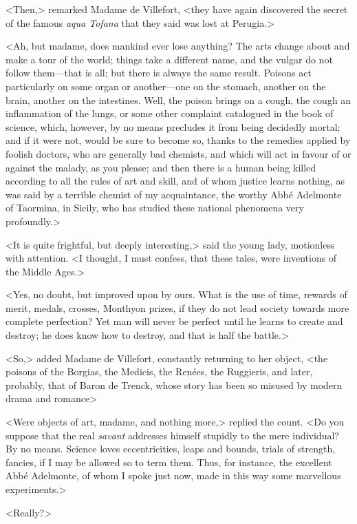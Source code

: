  <Then,> remarked Madame de Villefort, <they have again discovered the secret of the famous \textit{aqua Tofana} that they said was lost at Perugia.> 

 <Ah, but madame, does mankind ever lose anything? The arts change about and make a tour of the world; things take a different name, and the vulgar do not follow them—that is all; but there is always the same result. Poisons act particularly on some organ or another—one on the stomach, another on the brain, another on the intestines. Well, the poison brings on a cough, the cough an inflammation of the lungs, or some other complaint catalogued in the book of science, which, however, by no means precludes it from being decidedly mortal; and if it were not, would be sure to become so, thanks to the remedies applied by foolish doctors, who are generally bad chemists, and which will act in favour of or against the malady, as you please; and then there is a human being killed according to all the rules of art and skill, and of whom justice learns nothing, as was said by a terrible chemist of my acquaintance, the worthy Abbé Adelmonte of Taormina, in Sicily, who has studied these national phenomena very profoundly.> 

 <It is quite frightful, but deeply interesting,> said the young lady, motionless with attention. <I thought, I must confess, that these tales, were inventions of the Middle Ages.> 

 <Yes, no doubt, but improved upon by ours. What is the use of time, rewards of merit, medals, crosses, Monthyon prizes, if they do not lead society towards more complete perfection? Yet man will never be perfect until he learns to create and destroy; he does know how to destroy, and that is half the battle.> 

 <So,> added Madame de Villefort, constantly returning to her object, <the poisons of the Borgias, the Medicis, the Renées, the Ruggieris, and later, probably, that of Baron de Trenck, whose story has been so misused by modern drama and romance\longdash> 

 <Were objects of art, madame, and nothing more,> replied the count. <Do you suppose that the real \textit{savant} addresses himself stupidly to the mere individual? By no means. Science loves eccentricities, leaps and bounds, trials of strength, fancies, if I may be allowed so to term them. Thus, for instance, the excellent Abbé Adelmonte, of whom I spoke just now, made in this way some marvellous experiments.> 

 <Really?> 

